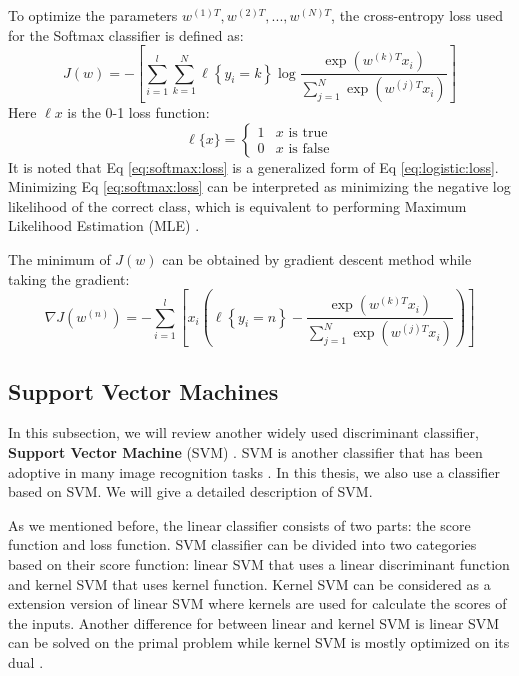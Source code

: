 To optimize the parameters $w^{(1)T},w^{({2})T},...,w^{({N})T}$, the cross-entropy loss used for the Softmax classifier is defined as:
\begin{equation}
J(w) =  - \left[ {\sum\limits_{i = 1}^l {\sum\limits_{k = 1}^N {\ell\left\{ {{y_i} = k} \right\}\log \frac{{\exp \left( {{w^{(k)T}}x_i} \right)}}{{\sum\nolimits_{j = 1}^N {\exp \left( {{w^{(j)T}}x_i} \right)} }}} } } \right] \label{eq:softmax:loss}
\end{equation}
Here $\ell{x}$ is the 0-1 loss function:
\begin{equation}
\ell \{ x\}  = \left\{ {\begin{array}{*{20}{c}}
	1&\text{$x$ is true}\\
	0&\text{$x$ is false}
	\end{array}} \right. 
\end{equation}
It is noted that Eq \eqref{eq:softmax:loss} is a generalized form of Eq \eqref{eq:logistic:loss}. Minimizing Eq \eqref{eq:softmax:loss} can be interpreted as minimizing the negative log likelihood of the correct class, which is equivalent to performing Maximum Likelihood Estimation (MLE) \cite{johansen1990maximum}.

The minimum of $J(w)$ can be obtained by gradient descent method while taking the gradient:
\begin{equation}
\nabla J({w^{(n)}}) =  - \sum\limits_{i = 1}^l {\left[ {{x_i}\left( {\ell \left\{ {{y_i} = n} \right\} - \frac{{\exp \left( {{w^{(k)T}}x_i} \right)}}{{\sum\nolimits_{j = 1}^N {\exp \left( {{w^{(j)T}}x_i} \right)} }}} \right)} \right]} 
\end{equation}

\subsection{Support Vector Machines}
In this subsection, we will review another widely used discriminant classifier, \textbf{Support Vector Machine} (SVM) \cite{cristianini2000introduction}. SVM is another classifier that has been adoptive in many image recognition tasks \cite{coates2011analysis} \cite{schuldt2004recognizing} \cite{yang2009linear}. In this thesis, we also use a classifier based on SVM. We will give a detailed description of SVM. 

As we mentioned before, the linear classifier consists of two parts: the score function and loss function. SVM classifier can be divided into two categories based on their score function: linear SVM that uses a linear discriminant function and kernel SVM that uses kernel function. Kernel SVM can be considered as a extension version of linear SVM where kernels are used for calculate the scores of the inputs. Another difference for between linear and kernel SVM is linear SVM can be solved on the primal problem while kernel SVM is mostly optimized on its dual \cite{cristianini2000introduction} \cite{shalev2011pegasos}.

